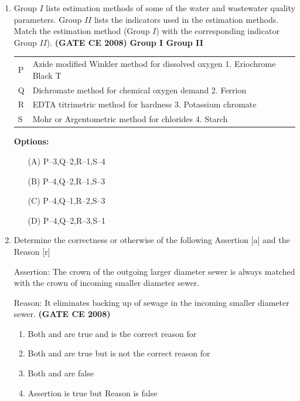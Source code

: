 \documentclass[journal]{IEEEtran}
\begin{document}
\begin{enumerate}
\item Group $I$ lists estimation methods of some of the water and wastewater quality parameters. Group $II$ lists the indicators used in the estimation methods. Match the estimation method (Group $I$) with the corresponding indicator Group $II$). \textbf{(GATE CE 2008)}
\textbf{Group I \hfill Group II}

\begin{tabular}{ll}
P & Azide modified Winkler method for dissolved oxygen \hfill 1. Eriochrome Black T \\
Q & Dichromate method for chemical oxygen demand \hfill 2. Ferrion \\
R & EDTA titrimetric method for hardness \hfill 3. Potassium chromate \\
S & Mohr or Argentometric method for chlorides \hfill 4. Starch \\
\end{tabular}

\vspace{0.5cm}

\textbf{Options:}
\begin{itemize}
  \item[(A)] P--3,\quad Q--2,\quad R--1,\quad S--4
  \item[(B)] P--4,\quad Q--2,\quad R--1,\quad S--3
  \item[(C)] P--4,\quad Q--1,\quad R--2,\quad S--3
  \item[(D)] P--4,\quad Q--2,\quad R--3,\quad S--1
\end{itemize}


\item Determine the correctness or otherwise of the following Assertion [a] and the Reason [r]
\vspace{0.1cm}

Assertion: The crown of the outgoing larger diameter sewer is always matched with the crown of
incoming smaller diameter sewer.
\vspace{0.1cm}

Reason: It eliminates backing up of sewage in the incoming smaller diameter sewer. \textbf{(GATE CE 2008)}

\begin{enumerate}
\item Both  and  are true and  is the correct reason for 
\item Both  and  are true but  is not the correct reason for 
\item Both  and  are false 
\item Assertion  is true but Reason is false 
\end{enumerate}     


\end{enumerate}
\end{document}
